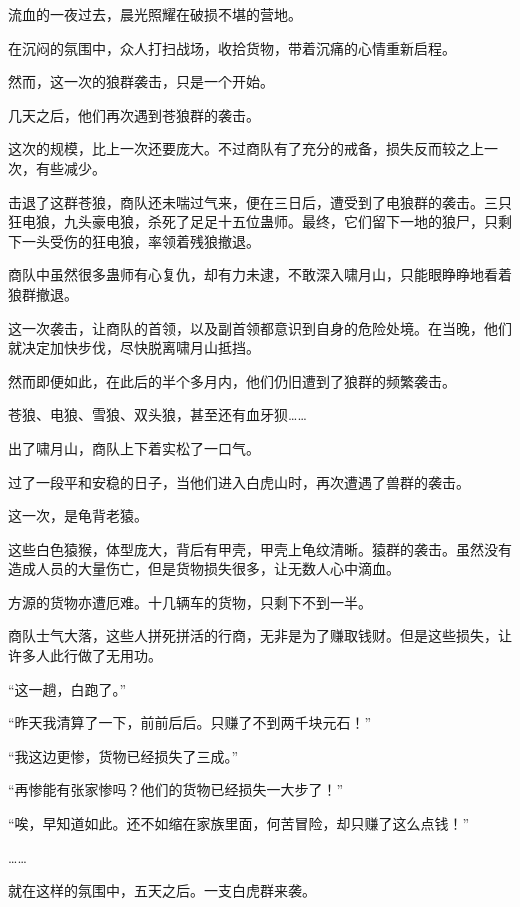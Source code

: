 
\begin{this_body}

流血的一夜过去，晨光照耀在破损不堪的营地。

在沉闷的氛围中，众人打扫战场，收拾货物，带着沉痛的心情重新启程。

然而，这一次的狼群袭击，只是一个开始。

几天之后，他们再次遇到苍狼群的袭击。

这次的规模，比上一次还要庞大。不过商队有了充分的戒备，损失反而较之上一次，有些减少。

击退了这群苍狼，商队还未喘过气来，便在三日后，遭受到了电狼群的袭击。三只狂电狼，九头豪电狼，杀死了足足十五位蛊师。最终，它们留下一地的狼尸，只剩下一头受伤的狂电狼，率领着残狼撤退。

商队中虽然很多蛊师有心复仇，却有力未逮，不敢深入啸月山，只能眼睁睁地看着狼群撤退。

这一次袭击，让商队的首领，以及副首领都意识到自身的危险处境。在当晚，他们就决定加快步伐，尽快脱离啸月山抵挡。

然而即便如此，在此后的半个多月内，他们仍旧遭到了狼群的频繁袭击。

苍狼、电狼、雪狼、双头狼，甚至还有血牙狈……

出了啸月山，商队上下着实松了一口气。

过了一段平和安稳的日子，当他们进入白虎山时，再次遭遇了兽群的袭击。

这一次，是龟背老猿。

这些白色猿猴，体型庞大，背后有甲壳，甲壳上龟纹清晰。猿群的袭击。虽然没有造成人员的大量伤亡，但是货物损失很多，让无数人心中滴血。

方源的货物亦遭厄难。十几辆车的货物，只剩下不到一半。

商队士气大落，这些人拼死拼活的行商，无非是为了赚取钱财。但是这些损失，让许多人此行做了无用功。

“这一趟，白跑了。”

“昨天我清算了一下，前前后后。只赚了不到两千块元石！”

“我这边更惨，货物已经损失了三成。”

“再惨能有张家惨吗？他们的货物已经损失一大步了！”

“唉，早知道如此。还不如缩在家族里面，何苦冒险，却只赚了这么点钱！”

……

就在这样的氛围中，五天之后。一支白虎群来袭。


\end{this_body}
